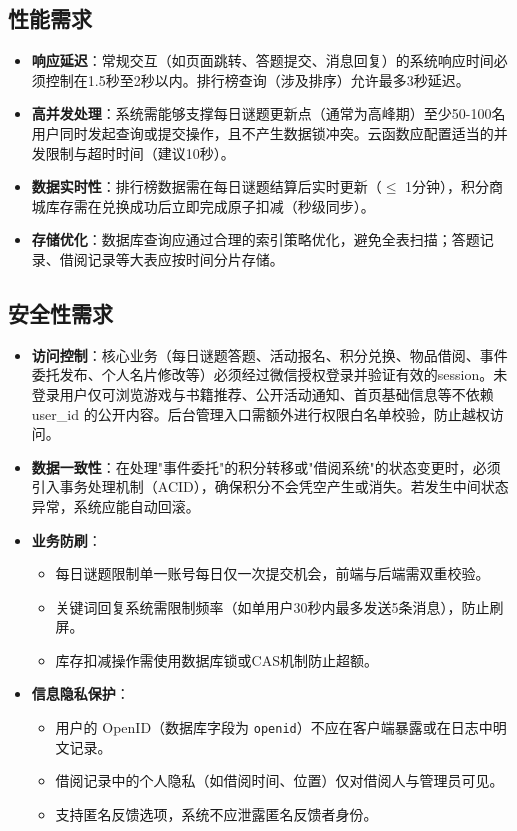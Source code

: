 \documentclass[a4paper,12pt]{article}
\begin{document}
\subsection{性能需求}
\begin{itemize}
    \item \textbf{响应延迟}：常规交互（如页面跳转、答题提交、消息回复）的系统响应时间必须控制在1.5秒至2秒以内。排行榜查询（涉及排序）允许最多3秒延迟。
    \item \textbf{高并发处理}：系统需能够支撑每日谜题更新点（通常为高峰期）至少50-100名用户同时发起查询或提交操作，且不产生数据锁冲突。云函数应配置适当的并发限制与超时时间（建议10秒）。
    \item \textbf{数据实时性}：排行榜数据需在每日谜题结算后实时更新（$\leq$ 1分钟），积分商城库存需在兑换成功后立即完成原子扣减（秒级同步）。
    \item \textbf{存储优化}：数据库查询应通过合理的索引策略优化，避免全表扫描；答题记录、借阅记录等大表应按时间分片存储。
\end{itemize}

\subsection{安全性需求}
\begin{itemize}
    \item \textbf{访问控制}：核心业务（每日谜题答题、活动报名、积分兑换、物品借阅、事件委托发布、个人名片修改等）必须经过微信授权登录并验证有效的session。未登录用户仅可浏览游戏与书籍推荐、公开活动通知、首页基础信息等不依赖 user\_id 的公开内容。后台管理入口需额外进行权限白名单校验，防止越权访问。
    \item \textbf{数据一致性}：在处理"事件委托"的积分转移或"借阅系统"的状态变更时，必须引入事务处理机制（ACID），确保积分不会凭空产生或消失。若发生中间状态异常，系统应能自动回滚。
    \item \textbf{业务防刷}：
        \begin{itemize}
            \item 每日谜题限制单一账号每日仅一次提交机会，前端与后端需双重校验。
            \item 关键词回复系统需限制频率（如单用户30秒内最多发送5条消息），防止刷屏。
            \item 库存扣减操作需使用数据库锁或CAS机制防止超额。
        \end{itemize}
    \item \textbf{信息隐私保护}：
        \begin{itemize}
            \item 用户的 OpenID（数据库字段为 \texttt{openid}）不应在客户端暴露或在日志中明文记录。
            \item 借阅记录中的个人隐私（如借阅时间、位置）仅对借阅人与管理员可见。
            \item 支持匿名反馈选项，系统不应泄露匿名反馈者身份。
        \end{itemize}
\end{itemize}
\end{document}
